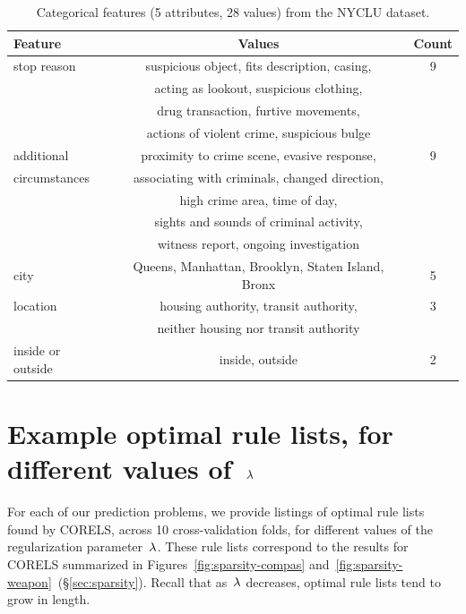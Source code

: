 \begin{table}[h!]
\centering
\begin{tabular}{l | c  c}
Feature & Values & Count \\
\hline
stop reason & suspicious object, fits description, casing, & 9 \\
& acting as lookout, suspicious clothing, & \\
& drug transaction, furtive movements, & \\
& actions of violent crime, suspicious bulge \\
\hline
additional & proximity to crime scene, evasive response,  & 9 \\
circumstances & associating with criminals, changed direction, & \\
& high crime area, time of day,  & \\
& sights and sounds of criminal activity, & \\
& witness report, ongoing investigation & \\
\hline
city & Queens,  Manhattan, Brooklyn, Staten Island, Bronx & 5 \\
\hline
location & housing authority, transit authority, & 3 \\
& neither housing nor transit authority & \\
\hline
inside or outside & inside, outside & 2 \\
\end{tabular}
\caption{Categorical features (5 attributes, 28 values) from the NYCLU dataset.}
\vspace{4mm}
\label{tab:frisk-data}
\end{table}

\section{Example optimal rule lists, for different values of~${\lambda}$}
\label{appendix:examples}

For each of our prediction problems, we provide listings of
optimal rule lists found by CORELS, across 10 cross-validation folds,
for different values of the regularization parameter~${\lambda}$.
%
These rule lists correspond to the results for CORELS summarized
in Figures~\ref{fig:sparsity-compas} and~\ref{fig:sparsity-weapon}~(\S\ref{sec:sparsity}).
%
Recall that as~${\lambda}$ decreases, optimal rule lists tend to grow in length. \\

